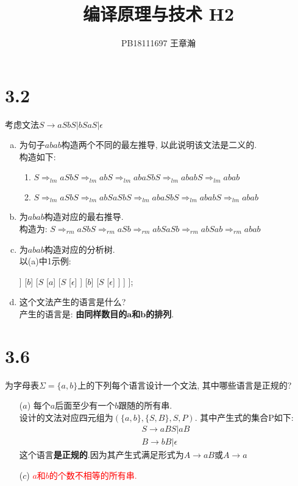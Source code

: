 \documentclass[UTF8]{article}
\title{编译原理与技术 H2}
\date{}
\author{PB18111697 王章瀚}
\begin{document}
\maketitle

\section*{3.2}
\noindent 考虑文法$S\rightarrow aSbS|bSaS|\epsilon$
\begin{enumerate}[(a) ]
\item 为句子$abab$构造两个不同的最左推导, 以此说明该文法是二义的.\\
	构造如下:
	\begin{enumerate}[1. ]
	\item $S \Rightarrow_{lm} aSbS \Rightarrow_{lm} abS \Rightarrow_{lm} abaSbS \Rightarrow_{lm} ababS \Rightarrow_{lm} abab$
	\item $S \Rightarrow_{lm} aSbS \Rightarrow_{lm} abSaSbS \Rightarrow_{lm} abaSbS \Rightarrow_{lm} ababS \Rightarrow_{lm} abab$
	\end{enumerate}
\item 为$abab$构造对应的最右推导.\\
	构造为: $S \Rightarrow_{rm} aSbS \Rightarrow_{rm} aSb \Rightarrow_{rm} abSaSb \Rightarrow_{rm} abSab \Rightarrow_{rm} abab$
\item 为$abab$构造对应的分析树.\\
	以(a)中1示例:\\
	\begin{forest}
	[$S$
		[$a$]
		[$S$
			[$\epsilon$]
		]
		[$b$]
		[$S$
			[$a$]
			[$S$
				[$\epsilon$]
			]
			[$b$]
			[$S$
				[$\epsilon$]
			]
		]
	];
	\end{forest}
\item 这个文法产生的语言是什么?\\
	产生的语言是: \textbf{由同样数目的$\bm{a}$和$\bm{b}$的排列}.
\end{enumerate}

\section*{3.6}
\noindent 为字母表$\Sigma=\{a,b\}$上的下列每个语言设计一个文法, 其中哪些语言是正规的?
\begin{enumerate}
\item[($a$) ] 每个$a$后面至少有一个$b$跟随的所有串.\\
	设计的文法对应四元组为$(\{a,b\},\{S,B\}, S, P)$. 其中产生式的集合P如下: 
	$$\begin{array}{l}
	S \rightarrow aBS|aB\\
	B \rightarrow bB|\epsilon
	\end{array}$$
	这个语言\textbf{是正规的}.因为其产生式满足形式为$A\rightarrow aB$或$A\rightarrow a$
\item[($c$) ] \textcolor{red}{$a$和$b$的个数不相等的所有串.}
\end{enumerate}
\end{document}
